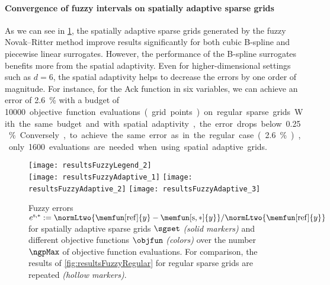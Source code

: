 \begin{algorithm}
\begin{algorithmic}[1]
        \EndFor{}
      \EndWhile{}
    \EndFunction{}
  \end{algorithmic}
  \caption[Fuzzy Novak--Ritter method]{%
    Fuzzy Novak--Ritter method to generate spatially adaptive sparse grids
    for the fuzzy extension principle.
    Inputs are
    the objective function $\objfun$,
    the adaptivity parameter $\gamma \in \clint{0, 1}$,
    the number of $\alpha$ segments,
    the initial sparse grid $\liset$ as a set of level-index pairs, and the
    the $d$ fuzzy intervals $\fuzzy{x}_1, \dotsc, \fuzzy{x}_d$.
    Output is the spatially adaptive sparse grid $\liset$.%
  }%
  \label{alg:fuzzyNovakRitterMethod}%
\end{algorithm}

\paragraph{Convergence of fuzzy intervals on spatially adaptive sparse grids}

As we can see in \cref{fig:resultsFuzzyAdaptive},
the spatially adaptive sparse grids generated by the fuzzy Novak--Ritter
method improve results significantly
for both cubic B-spline and piecewise linear surrogates.
However, the performance of the B-spline surrogates benefits more
from the spatial adaptivity.
Even for higher-dimensional settings such as $d = 6$,
the spatial adaptivity helps to decrease the errors by one order of magnitude.
For instance, for the Ack function in six variables,
we can achieve an error of \SI{2.6}{\percent}
with a budget of \SI{10000} objective function evaluations (grid points)
on regular sparse grids.
With the same budget and with spatial adaptivity, the error drops below
\SI{0.25}{\percent}.
Conversely, to achieve the same error as in the regular case
(\SI{2.6}{\percent}),
only \SI{1600} evaluations are needed when using spatial adaptive grids.

\begin{figure}
  \texttt{[image: resultsFuzzyLegend\_2]}\\[2mm]%
  \texttt{[image: resultsFuzzyAdaptive\_1]}%
  \hfill%
  \texttt{[image: resultsFuzzyAdaptive\_2]}%
  \hfill%
  \texttt{[image: resultsFuzzyAdaptive\_3]}%
  \caption[Fuzzy errors for spatially adaptive sparse grids]{%
    Fuzzy errors
    $e^{\sparse,\ast}
    := \normLtwo{\memfun[\reference]{y} - \memfun[\sparse,\ast]{y}}/
    \normLtwo{\memfun[\reference]{y}}$
    for spatially adaptive sparse grids $\sgset$ \emph{(solid markers)}
    and different objective functions $\objfun$ \emph{(colors)}
    over the number $\ngpMax$ of objective function evaluations.
    For comparison, the results of \cref{fig:resultsFuzzyRegular}
    for regular sparse grids are repeated \emph{(hollow markers)}.%
  }%
  \label{fig:resultsFuzzyAdaptive}%
\end{figure}

